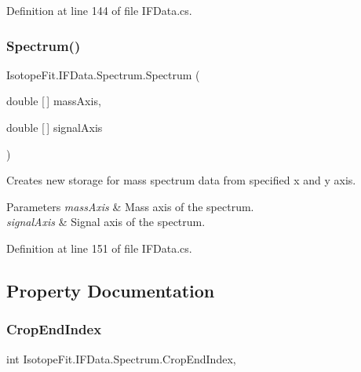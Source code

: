 Definition at line 144 of file I\+F\+Data.\+cs.

\mbox{\label{class_isotope_fit_1_1_i_f_data_1_1_spectrum_a0422d7cbabadc258d3dc6f1fd51f2e36}} 
\subsubsection{\texorpdfstring{Spectrum()}{Spectrum()}\hspace{0.1cm}{\footnotesize\ttfamily [2/2]}}
{\footnotesize\ttfamily Isotope\+Fit.\+I\+F\+Data.\+Spectrum.\+Spectrum (\begin{DoxyParamCaption}\item[{double \mbox{[}$\,$\mbox{]}}]{mass\+Axis,  }\item[{double \mbox{[}$\,$\mbox{]}}]{signal\+Axis }\end{DoxyParamCaption})}



Creates new storage for mass spectrum data from specified x and y axis. 


\begin{DoxyParams}{Parameters}
{\em mass\+Axis} & Mass axis of the spectrum.\\
\hline
{\em signal\+Axis} & Signal axis of the spectrum.\\
\hline
\end{DoxyParams}


Definition at line 151 of file I\+F\+Data.\+cs.



\subsection{Property Documentation}
\mbox{\label{class_isotope_fit_1_1_i_f_data_1_1_spectrum_a8b0c276faef24f22d7d535f74547bd7a}} 
\subsubsection{\texorpdfstring{Crop\+End\+Index}{CropEndIndex}}
{\footnotesize\ttfamily int Isotope\+Fit.\+I\+F\+Data.\+Spectrum.\+Crop\+End\+Index\hspace{0.3cm}{\ttfamily [get]}, {\ttfamily [set]}}



